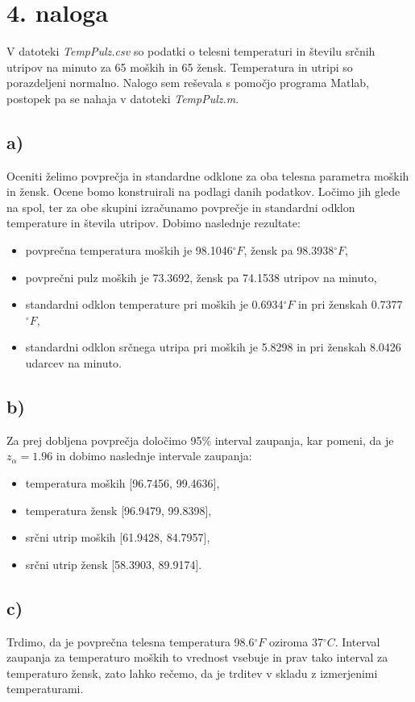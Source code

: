 \documentclass[A4paper, 11pt]{article}
\begin{document}

\section*{4. naloga}

V datoteki \textit{TempPulz.csv} so podatki o telesni temperaturi in številu srčnih utripov na minuto za 65 moških in 65 žensk. Temperatura in utripi so porazdeljeni normalno. Nalogo sem reševala s pomočjo programa Matlab, postopek pa se nahaja v datoteki \textit{TempPulz.m}.

\subsection*{a)}
Oceniti želimo povprečja in standardne odklone za oba telesna parametra moških in žensk. Ocene bomo konstruirali na podlagi danih podatkov. Ločimo jih glede na spol, ter za obe skupini izračunamo povprečje in standardni odklon temperature in števila utripov.
Dobimo naslednje rezultate:
\begin{itemize}
\item povprečna temperatura moških je 98.1046$^{\circ}F$, žensk pa 98.3938$^{\circ}F$,
\item povprečni pulz moških je 73.3692, žensk pa 74.1538 utripov na minuto,
\item standardni odklon temperature pri moških je 0.6934$^{\circ}F$ in pri ženskah 0.7377$^{\circ}F$,
\item standardni odklon srčnega utripa pri moških je 5.8298 in pri ženskah 8.0426 udarcev na minuto. 
\end{itemize}

\subsection*{b)}
Za prej dobljena povprečja določimo 95\% interval zaupanja, kar pomeni, da je $z_\alpha = 1.96$ in dobimo naslednje intervale zaupanja:
\begin{itemize}
\item temperatura moških [96.7456, 99.4636],
\item temperatura žensk [96.9479, 99.8398],
\item srčni utrip moških [61.9428, 84.7957],
\item srčni utrip žensk [58.3903, 89.9174].
\end{itemize}

\subsection*{c)}
Trdimo, da je povprečna telesna temperatura 98.6$^{\circ}F$ oziroma 37$^{\circ}C$. Interval zaupanja za temperaturo moških to vrednost vsebuje in prav tako interval za temperaturo žensk, zato lahko rečemo, da je trditev v skladu z izmerjenimi temperaturami.
\end{document}
